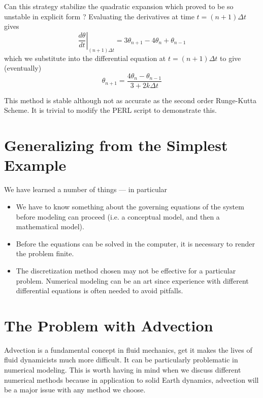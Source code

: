 \documentclass[10pt]{article}
\begin{document}
	Can this strategy stabilize the quadratic expansion which
	proved to be so unstable in explicit form ?
	Evaluating the derivatives at time $t=(n+1)\Delta t$ gives
		\begin{equation}
			\left. \frac{d \theta}{d t} \right|_{(n+1)\Delta t} = 3 \theta_{n+1} - 4\theta_n + \theta_{n-1}	
		\end{equation}
	which we substitute into the differential equation at $t=(n+1)\Delta t$ to
	give (eventually)
		\begin{equation}
			\theta_{n+1} = \frac{4\theta_n - \theta_{n-1}}{3+2k\Delta t}
		\end{equation}
	
	This method is stable although not as accurate as the 
	second order Runge-Kutta Scheme. It is trivial to modify the
	PERL script to demonstrate this.	

\section{Generalizing from the Simplest Example}
 We have learned a number of things --- in particular
 
\begin{itemize}

		\item We have to know something about the governing
		equations of the system before modeling can proceed (i.e. a 
		conceptual model, and then a mathematical model).

	\item Before the equations can be solved in the computer, it is
		necessary to render the problem finite.
			
	\item 
		The discretization method chosen may not be effective for a particular
		problem. Numerical modeling can be an art since experience with different
		differential equations is often needed to avoid pitfalls.
	
\end{itemize}


\section{The Problem with Advection}	

	Advection is a fundamental concept in fluid mechanics, get it makes
	the lives of fluid dynamicists much more difficult. It can be particularly
	problematic in numerical modeling. This is worth having in 
	mind when we discuss different numerical methods because
	in application to solid Earth dynamics, advection will be a major
	issue with any method we choose.
	
\end{document}
